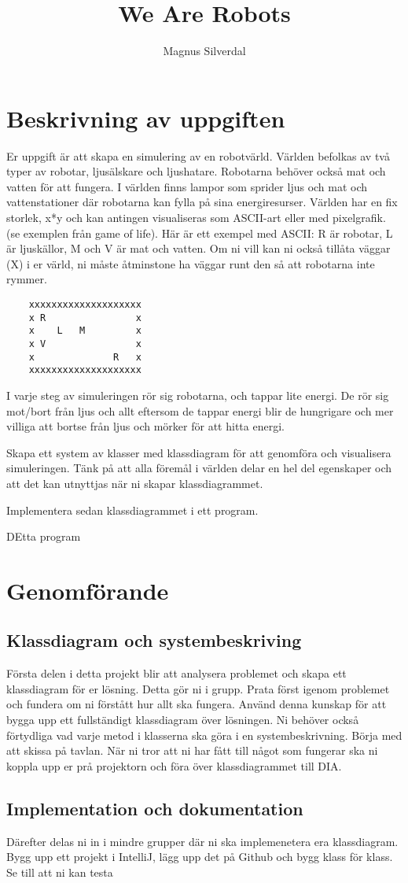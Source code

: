 \documentclass[11pt]{article}
\title{We Are Robots}
\author{Magnus Silverdal}
\begin{document}
    \maketitle
    \newpage
    \section{Beskrivning av uppgiften}
    Er uppgift är att skapa en simulering av en robotvärld. Världen befolkas av två typer av robotar, ljusälskare och ljushatare.
    Robotarna behöver också mat och vatten för att fungera. I världen finns lampor som sprider ljus och mat och vattenstationer
    där robotarna kan fylla på sina energiresurser. Världen har en fix storlek, x*y och kan antingen visualiseras som ASCII-art
    eller med pixelgrafik. (se exemplen från game of life).  Här är ett exempel med ASCII:
    R är robotar, L är ljuskällor, M och V är mat och vatten. Om ni vill kan ni också tillåta väggar (X) i er värld, ni måste
    åtminstone ha väggar runt den så att robotarna inte rymmer.
    \begin{verbatim}
    xxxxxxxxxxxxxxxxxxxx
    x R                x
    x    L   M         x
    x V                x
    x              R   x
    xxxxxxxxxxxxxxxxxxxx
    \end{verbatim}
    I varje steg av simuleringen rör sig robotarna, och tappar lite energi. De rör sig mot/bort från ljus och allt eftersom
    de tappar energi blir de hungrigare och mer villiga att bortse från ljus och mörker för att hitta energi.

    Skapa ett system av klasser med klassdiagram för att genomföra och visualisera simuleringen. Tänk på att alla föremål i
    världen delar en hel del egenskaper och att det kan utnyttjas när ni skapar klassdiagrammet.

    Implementera sedan klassdiagrammet i ett program.

    DEtta program
    \section{Genomförande}
    \subsection{Klassdiagram och systembeskriving}
    Första delen i detta projekt blir att analysera problemet och skapa ett klassdiagram för er lösning. Detta gör ni i grupp.
    Prata först igenom problemet och fundera om ni förstått hur allt ska fungera. Använd denna kunskap för att bygga upp ett
    fullständigt klassdiagram över lösningen. Ni behöver också förtydliga vad varje metod i klasserna ska göra i en systembeskrivning.
    Börja med att skissa på tavlan. När ni tror att ni har fått till något som fungerar ska ni koppla upp er prå projektorn
    och föra över klassdiagrammet till DIA.
    \subsection{Implementation och dokumentation}
    Därefter delas ni in i mindre grupper där ni ska implemenetera era klassdiagram. Bygg upp ett projekt i IntelliJ,
    lägg upp det på Github och bygg klass för klass. Se till att ni kan testa
\end{document}
